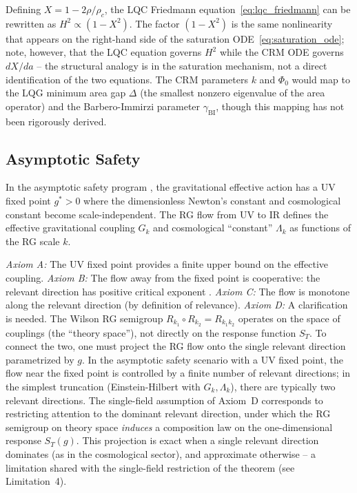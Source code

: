 \documentclass[aps,prd,twocolumn,superscriptaddress,nofootinbib]{revtex4-2}
\begin{document}
Defining $X = 1 - 2\rho/\rho_c$, the LQC Friedmann equation~\eqref{eq:lqc_friedmann} can be rewritten as $H^2 \propto (1 - X^2)$. The factor $(1-X^2)$ is the same nonlinearity that appears on the right-hand side of the saturation ODE~\eqref{eq:saturation_ode}; note, however, that the LQC equation governs $H^2$ while the CRM ODE governs $dX/da$ -- the structural analogy is in the saturation mechanism, not a direct identification of the two equations. The CRM parameters $k$ and $\Phi_0$ would map to the LQG minimum area gap $\Delta$ (the smallest nonzero eigenvalue of the area operator) and the Barbero-Immirzi parameter $\gamma_{\mathrm{BI}}$, though this mapping has not been rigorously derived.

\subsection{Asymptotic Safety}

In the asymptotic safety program \cite{Weinberg1979,Reuter1998,Percacci2017}, the gravitational effective action has a UV fixed point $g^* > 0$ where the dimensionless Newton's constant and cosmological constant become scale-independent. The RG flow from UV to IR defines the effective gravitational coupling $G_k$ and cosmological ``constant'' $\Lambda_k$ as functions of the RG scale $k$.

\textit{Axiom A:} The UV fixed point provides a finite upper bound on the effective coupling. \textit{Axiom B:} The flow away from the fixed point is cooperative: the relevant direction has positive critical exponent \cite{Percacci2017}. \textit{Axiom C:} The flow is monotone along the relevant direction (by definition of relevance). \textit{Axiom D:} A clarification is needed. The Wilson RG semigroup $R_{k_1} \circ R_{k_2} = R_{k_1 k_2}$ operates on the space of couplings (the ``theory space''), not directly on the response function $S_T$. To connect the two, one must project the RG flow onto the single relevant direction parametrized by $g$. In the asymptotic safety scenario with a UV fixed point, the flow near the fixed point is controlled by a finite number of relevant directions; in the simplest truncation (Einstein-Hilbert with $G_k, \Lambda_k$), there are typically two relevant directions. The single-field assumption of Axiom~D corresponds to restricting attention to the dominant relevant direction, under which the RG semigroup on theory space \textit{induces} a composition law on the one-dimensional response $S_T(g)$. This projection is exact when a single relevant direction dominates (as in the cosmological sector), and approximate otherwise -- a limitation shared with the single-field restriction of the theorem (see Limitation~4).
\end{document}
